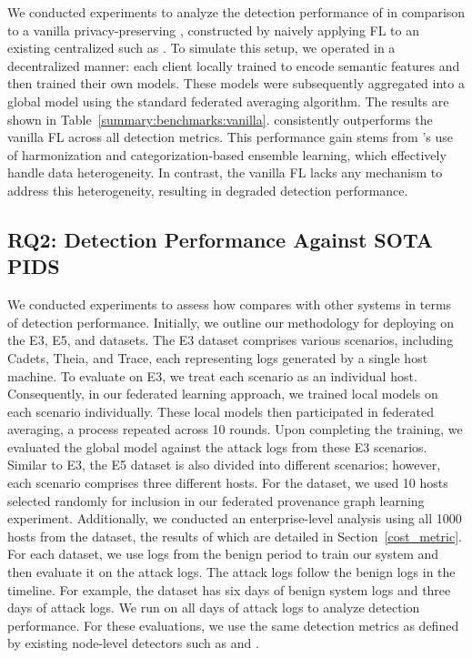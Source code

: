 We conducted experiments to analyze the detection performance of \Sys in comparison to a vanilla privacy-preserving \pids, constructed by naively applying FL to an existing centralized \pids such as \flash. To simulate this setup, we operated \flash in a decentralized manner: each client locally trained \wordvec to encode semantic features and then trained their own \gnnshort models. These models were subsequently aggregated into a global model using the standard federated averaging algorithm. The results are shown in Table~\ref{summary:benchmarks:vanilla}. \Sys consistently outperforms the vanilla FL \flash across all detection metrics. This performance gain stems from \Sys's use of \wordvec harmonization and categorization-based ensemble learning, which effectively handle data heterogeneity. In contrast, the vanilla FL \flash lacks any mechanism to address this heterogeneity, resulting in degraded detection performance.



 \subsection{RQ2: Detection Performance Against SOTA PIDS}
 \label{sub:detect:perf}

 
We conducted experiments to assess how \Sys compares with other systems in terms of detection performance. Initially, we outline our methodology for deploying \Sys on the \darpa E3, E5, and \optc datasets. The E3 dataset comprises various scenarios, including Cadets, Theia, and Trace, each representing logs generated by a single host machine. To evaluate \Sys on E3, we treat each scenario as an individual host. Consequently, in our federated learning approach, we trained local \gnnshort models on each scenario individually. These local models then participated in federated averaging, a process repeated across 10 rounds. Upon completing the training, we evaluated the global \gnnshort model against the attack logs from these E3 scenarios. Similar to E3, the E5 dataset is also divided into different scenarios; however, each scenario comprises three different hosts. For the \optc dataset, we used 10 hosts selected randomly for inclusion in our federated provenance graph learning experiment. Additionally, we conducted an enterprise-level analysis using all 1000 hosts from the \optc dataset, the results of which are detailed in Section~\ref{cost_metric}. For each dataset, we use logs from the benign period to train our system and then evaluate it on the attack logs. The attack logs follow the benign logs in the timeline. For example, the \optc dataset has six days of benign system logs and three days of attack logs. We run \Sys on all days of attack logs to analyze detection performance. For these evaluations, we use the same detection metrics as defined by existing node-level detectors such as \threatrace and \flash.

